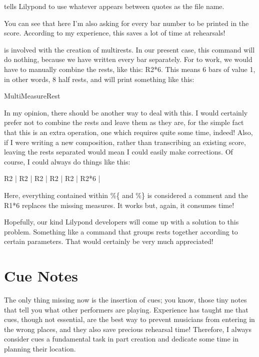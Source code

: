 \documentclass[../../LilyPond-Tutorials]{subfiles}
\begin{document}
 tells Lilypond to use whatever appears between quotes as the file name.

You can see that here I'm also asking for every bar number to be printed in the score.
According to my experience, this saves a lot of time at rehearsals!

 is involved with the creation of multirests.
In our present case, this command will do nothing, because we have written every bar separately.
For  to work, we would have to manually combine the rests, like this: R2*6.
This means 6 bars of value 1, in other words, 8 half rests, and will print something like this:

\begin{musicExample}
\caption{MultiMeasureRest}
\label{xmp:multi-measure-rest}
\end{musicExample}

In my opinion, there should be another way to deal with this.
I would certainly prefer not to combine the rests and leave them as they are, for the simple fact that this is an extra operation, one which requires quite some time, indeed!
Also, if I were writing a new composition, rather than transcribing an existing score, leaving the rests separated would mean I could easily make corrections.
Of course, I could always do things like this:

\begin{lilypondcode}
R2 | %
R2 | %
R2 | %
R2 | %
R2 | %
R2*6 | %
\end{lilypondcode}

Here, everything contained within \%\{ and \%\} is considered a comment and the R1*6 replaces the missing measures.
It works but, again, it consumes time!

Hopefully, our kind Lilypond developers will come up with a solution to this problem.
Something like a command that groups rests together according to certain parameters.
That would certainly be very much appreciated!

\section{Cue Notes}
The only thing missing now is the insertion of cues; you know, those tiny notes that tell you what other performers are playing.
Experience has taught me that cues, though not essential, are the best way to prevent musicians from entering in the wrong places, and they also save precious rehearsal time!
Therefore, I always consider cues a fundamental task in part creation and dedicate some time in planning their location.
\end{document}
